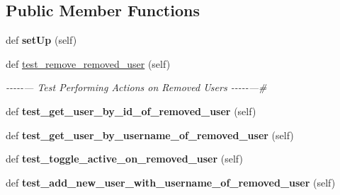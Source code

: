 \subsection*{Public Member Functions}
\begin{DoxyCompactItemize}
\item 
\mbox{\label{classtests_1_1test__13__actions__on__removed__user_1_1_test_user_routes_a0452644bd32ddb13fd0a2cc1840ab5d0}} 
def {\bfseries set\+Up} (self)
\item 
\mbox{\label{classtests_1_1test__13__actions__on__removed__user_1_1_test_user_routes_a541d374f819e00df9fe83d205b50a37e}} 
def \hyperlink{classtests_1_1test__13__actions__on__removed__user_1_1_test_user_routes_a541d374f819e00df9fe83d205b50a37e}{test\+\_\+remove\+\_\+removed\+\_\+user} (self)
\begin{DoxyCompactList}\small\item\em -\/-\/-\/-\/-\/--- Test Performing Actions on Removed Users -\/-\/-\/-\/-\/---\# \end{DoxyCompactList}\item 
\mbox{\label{classtests_1_1test__13__actions__on__removed__user_1_1_test_user_routes_ab9e4aee139ec8ad6146daca42332b062}} 
def {\bfseries test\+\_\+get\+\_\+user\+\_\+by\+\_\+id\+\_\+of\+\_\+removed\+\_\+user} (self)
\item 
\mbox{\label{classtests_1_1test__13__actions__on__removed__user_1_1_test_user_routes_afc8631ce10ede4b6ff2120d03662fd89}} 
def {\bfseries test\+\_\+get\+\_\+user\+\_\+by\+\_\+username\+\_\+of\+\_\+removed\+\_\+user} (self)
\item 
\mbox{\label{classtests_1_1test__13__actions__on__removed__user_1_1_test_user_routes_a1beb450a43bb0e60bf70296789eb0dbe}} 
def {\bfseries test\+\_\+toggle\+\_\+active\+\_\+on\+\_\+removed\+\_\+user} (self)
\item 
\mbox{\label{classtests_1_1test__13__actions__on__removed__user_1_1_test_user_routes_a46d3cffc09c23e5928f59152c0b013e9}} 
def {\bfseries test\+\_\+add\+\_\+new\+\_\+user\+\_\+with\+\_\+username\+\_\+of\+\_\+removed\+\_\+user} (self)
\end{DoxyCompactItemize}
